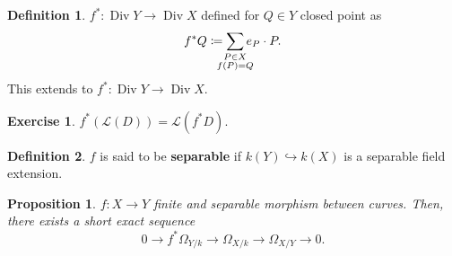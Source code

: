 \documentclass[12pt]{article}
\DeclareMathOperator{\Div}{Div}
\newtheorem*{proposition}{Proposition}
\theoremstyle{definition}
\newtheorem*{definition}{Definition}
\newtheorem*{exercise}{Exercise}
\theoremstyle{remark}
\newtheorem*{comment}{Comment}
\begin{document}
\begin{comment}
$\mathcal{O}_{Y_f(P)}$ is a DVR because we are in a curve, where prime divisors are the closed points.
\end{comment}

\begin{definition}
$f^*:\Div Y\longrightarrow\Div X$ defined for $Q\in Y$ closed point as
\[f^*Q\coloneqq\sum_{\mathclap{\substack{P\in X\\f(P)=Q}}}e_P\cdot P.\]
This extends to $f^*:\Div Y\rightarrow\Div X$.
\end{definition}

\begin{exercise}
$f^*(\mathcal{L}(D))=\mathcal{L}(f^*D)$.
\end{exercise}

\begin{definition}
$f$ is said to be \textbf{separable} if $k(Y)\hookrightarrow k(X)$ is a separable field extension.
\end{definition}

\begin{proposition}
$f:X\rightarrow Y$ finite and separable morphism between curves. Then, there exists a short exact sequence
\[0\longrightarrow f^*\Omega_{Y/k}\longrightarrow\Omega_{X/k}\longrightarrow\Omega_{X/Y}\rightarrow0.\]
\end{proposition}
\end{document}
